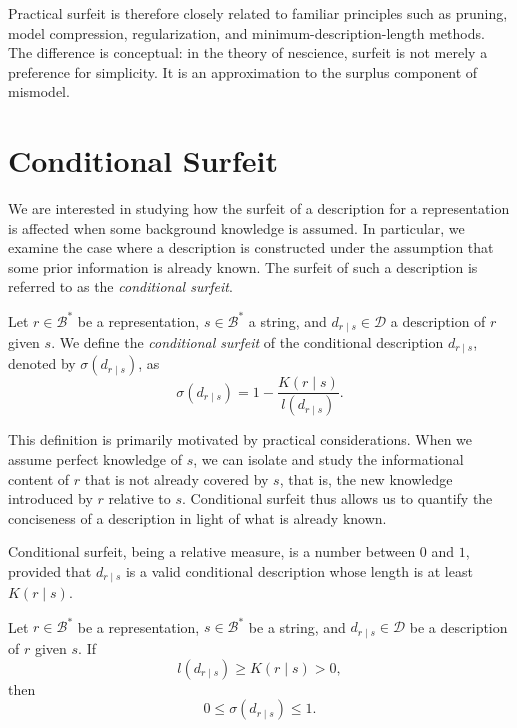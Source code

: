 Practical surfeit is therefore closely related to familiar principles such as pruning, model compression, regularization, and minimum-description-length methods. The difference is conceptual: in the theory of nescience, surfeit is not merely a preference for simplicity. It is an approximation to the surplus component of mismodel.

%
%

\section{Conditional Surfeit}
\label{sec:conditional_surfeit}

We are interested in studying how the surfeit of a description for a representation is affected when some background knowledge is assumed. In particular, we examine the case where a description is constructed under the assumption that some prior information is already known. The surfeit of such a description is referred to as the \emph{conditional surfeit}.

\begin{definition}
Let \(r\in\mathcal B^\ast\) be a representation, \(s\in\mathcal B^\ast\) a string, and \(d_{r\mid s}\in\mathcal D\) a description of \(r\) given \(s\). We define the \emph{conditional surfeit} of the conditional description \(d_{r\mid s}\), denoted by \(\sigma(d_{r\mid s})\), as
\[
\sigma(d_{r\mid s})
=
1-\frac{K(r\mid s)}{l(d_{r\mid s})}.
\]
\end{definition}

This definition is primarily motivated by practical considerations. When we assume perfect knowledge of \(s\), we can isolate and study the informational content of \(r\) that is not already covered by \(s\), that is, the new knowledge introduced by \(r\) relative to \(s\). Conditional surfeit thus allows us to quantify the conciseness of a description in light of what is already known.

Conditional surfeit, being a relative measure, is a number between \(0\) and \(1\), provided that \(d_{r\mid s}\) is a valid conditional description whose length is at least \(K(r\mid s)\).

\begin{proposition}
Let \(r\in\mathcal B^\ast\) be a representation, \(s\in\mathcal B^\ast\) be a string, and \(d_{r\mid s}\in\mathcal D\) be a description of \(r\) given \(s\). If
\[
l(d_{r\mid s})\geq K(r\mid s)>0,
\]
then
\[
0\leq \sigma(d_{r\mid s})\leq 1.
\]
\end{proposition}

